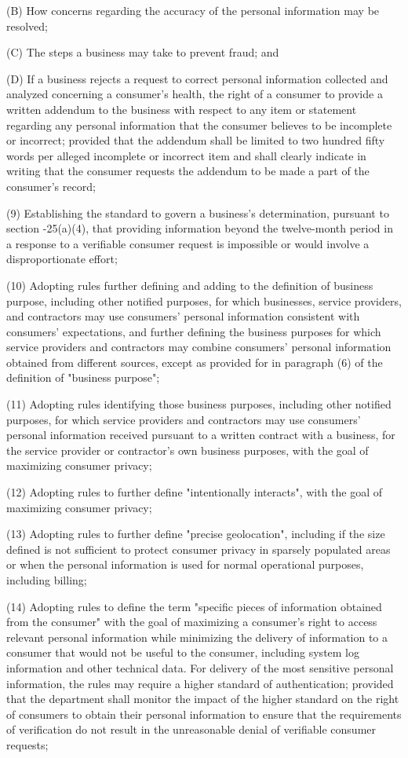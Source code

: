           (B)  How concerns regarding the accuracy of the personal information may be resolved;

          (C)  The steps a business may take to prevent fraud; and

          (D)  If a business rejects a request to correct personal information collected and analyzed concerning a consumer's health, the right of a consumer to provide a written addendum to the business with respect to any item or statement regarding any personal information that the consumer believes to be incomplete or incorrect; provided that the addendum shall be limited to two hundred fifty words per alleged incomplete or incorrect item and shall clearly indicate in writing that the consumer requests the addendum to be made a part of the consumer's record;

     (9)  Establishing the standard to govern a business's determination, pursuant to section    -25(a)(4), that providing information beyond the twelve-month period in a response to a verifiable consumer request is impossible or would involve a disproportionate effort;

    (10)  Adopting rules further defining and adding to the definition of business purpose, including other notified purposes, for which businesses, service providers, and contractors may use consumers' personal information consistent with consumers' expectations, and further defining the business purposes for which service providers and contractors may combine consumers' personal information obtained from different sources, except as provided for in paragraph (6) of the definition of "business purpose";

    (11)  Adopting rules identifying those business purposes, including other notified purposes, for which service providers and contractors may use consumers' personal information received pursuant to a written contract with a business, for the service provider or contractor's own business purposes, with the goal of maximizing consumer privacy;

    (12)  Adopting rules to further define "intentionally interacts", with the goal of maximizing consumer privacy;

    (13)  Adopting rules to further define "precise geolocation", including if the size defined is not sufficient to protect consumer privacy in sparsely populated areas or when the personal information is used for normal operational purposes, including billing;

    (14)  Adopting rules to define the term "specific pieces of information obtained from the consumer" with the goal of maximizing a consumer's right to access relevant personal information while minimizing the delivery of information to a consumer that would not be useful to the consumer, including system log information and other technical data.  For delivery of the most sensitive personal information, the rules may require a higher standard of authentication; provided that the department shall monitor the impact of the higher standard on the right of consumers to obtain their personal information to ensure that the requirements of verification do not result in the unreasonable denial of verifiable consumer requests;


